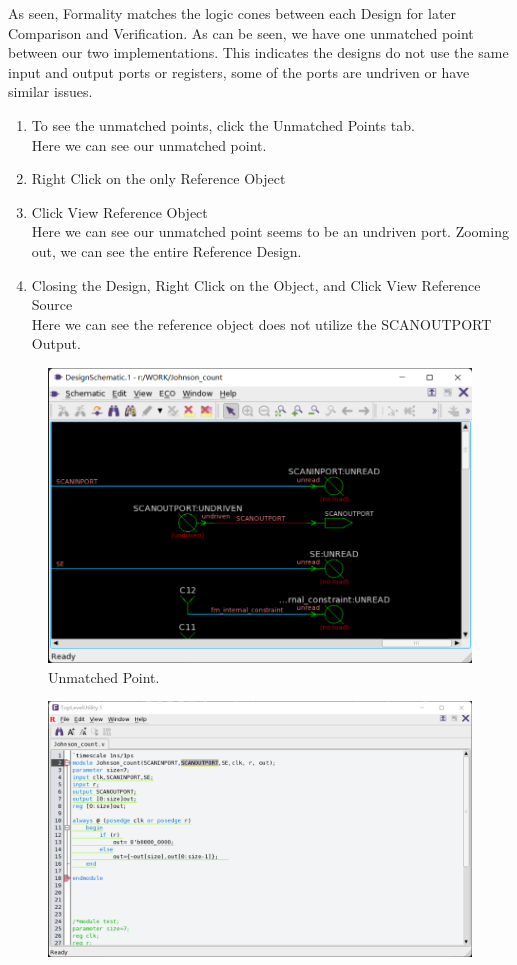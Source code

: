 \documentclass[a4paper,12pt,twoside]{article}
\begin{document}
As seen, Formality matches the logic cones between each Design for later Comparison and Verification. As can be seen, we have one unmatched point between our two implementations. This indicates the designs do not use the same input and output ports or registers, some of the ports are undriven or have similar issues.
\begin{enumerate}
    \item To see the unmatched points, click the Unmatched Points tab.\\
    Here we can see our unmatched point.
    \item Right Click on the only Reference Object
    \item Click View Reference Object\\
    Here we can see our unmatched point seems to be an undriven port. Zooming out, we can see the entire Reference Design.
    \item Closing the Design, Right Click on the Object, and Click View Reference Source\\
    Here we can see the reference object does not utilize the SCANOUTPORT Output.
\end{enumerate}
\begin{figure}[H]
    \centering
    \includegraphics[width=\textwidth]{images/49.png}
    \caption{Unmatched Point.}
\end{figure}
\begin{figure}[H]
    \centering
    \includegraphics[width=\textwidth]{images/50.png}
\end{figure}
\end{document}
